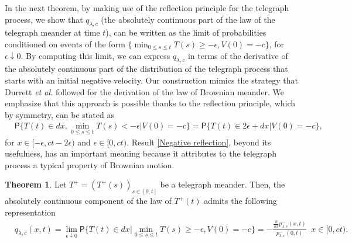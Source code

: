 \documentclass{article}
\theoremstyle{definition}
\newtheorem{theorem}{Theorem}[section]
\numberwithin{equation}{section}
\begin{document}
In the next theorem, by making use of the reflection principle for the telegraph process, we show that $q_{\lambda,c}$ (the absolutely continuous part of the law of the telegraph meander at time $t$), can be written as the limit of probabilities conditioned on events of the form ${\{\min_{0\leq s \leq t} T(s)\geq -\epsilon,V(0) = -c\}}$, for $\epsilon \downarrow 0$. By computing this limit, we can express $q_{\lambda,c}$ in terms of the derivative of the absolutely continuous part of the distribution of the telegraph process that starts with an initial negative velocity. Our construction mimics the strategy that Durrett \textit{et al.} followed for the derivation of the law of Brownian meander. We emphasize that this approach is possible thanks to the reflection principle, which by symmetry, can be stated as 
\begin{align}\label{Negative reflection}
&\mathsf{P}\{T(t) \in dx, \min_{0\leq s \leq t} T(s) < -\epsilon |V(0) = -c\} = \mathsf{P}\{T(t) \in 2\epsilon +dx|V(0) = -c\},
\end{align}
for $x \in[-\epsilon,ct-2\epsilon)$ and $\epsilon \in [0,ct)$. Result \eqref{Negative reflection}, beyond its usefulness, has an important meaning because it attributes to the telegraph process a typical property of Brownian motion. 
\begin{theorem}\label{Theorem telegraph meander t}
Let $T^+ = (T^+(s))_{s \in [0,t]}$ be a telegraph meander. Then, the absolutely continuous component of the law of $T^+(t)$ admits the following representation 
\begin{align}\label{Telegraph meander t 4}
&q_{\lambda,c}(x,t) = \lim_{\epsilon \downarrow 0}\mathsf{P}\{T(t) \in dx \lvert \min_{0\leq s \leq t} T(s) \geq -\epsilon,V(0) = -c\} =-\frac{\frac{\partial}{\partial x}p^{-}_{\lambda,c}(x,t)}{p_{\lambda,c}^{-}(0,t)} \;\; x \in [0,ct).
\end{align}
\end{theorem}
\end{document}

